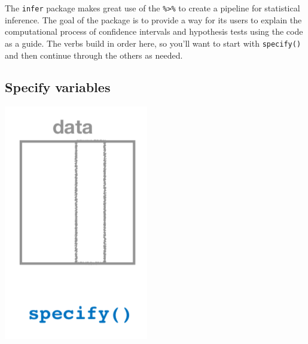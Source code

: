 \documentclass[12pt,]{krantz}
\begin{document}
The \texttt{infer} package makes great use of the
\texttt{\%\textgreater{}\%} to create a pipeline for statistical
inference. The goal of the package is to provide a way for its users to
explain the computational process of confidence intervals and hypothesis
tests using the code as a guide. The verbs build in order here, so
you'll want to start with \texttt{specify()} and then continue through
the others as needed.

\subsection{Specify variables}\label{specify-variables}

\begin{center}\includegraphics[width=\textwidth]{images/flowcharts/infer/specify} \end{center}
\end{document}
